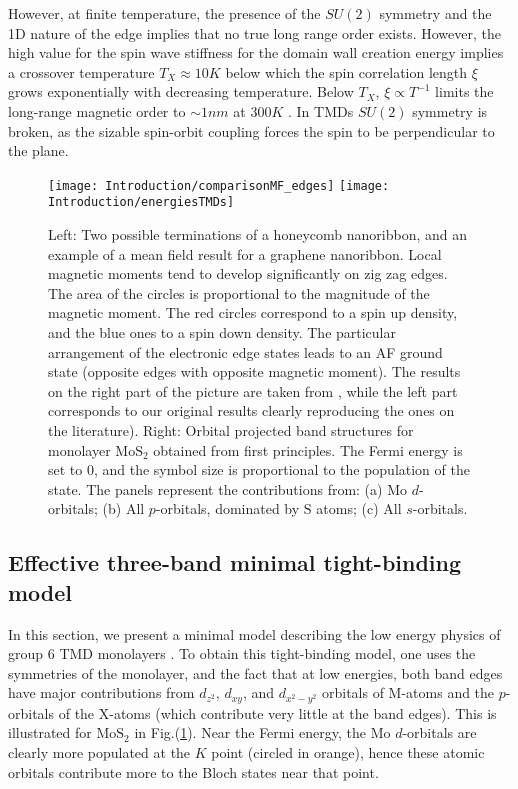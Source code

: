 However, at finite temperature, the presence of the $SU(2)$ symmetry and the \acs{1D} nature of the edge implies that no true long range order exists.
However, the high value for the spin wave stiffness for the domain wall creation energy implies a crossover temperature $T_X \approx 10 K$ below which the spin correlation length $\xi$ grows exponentially with decreasing temperature.
Below $T_X$, $\xi \propto T^{-1}$ limits the long-range magnetic order to $\sim 1 nm$ at $300 K$ \cite{yazyev_magnetic_2008}. 
In \acs{TMD}s $SU(2)$ symmetry is broken, as the sizable spin-orbit coupling forces the spin to be perpendicular to the plane.
\begin{figure}[H]
\texttt{[image: Introduction/comparisonMF\_edges]}
\hspace{5mm}
\texttt{[image: Introduction/energiesTMDs]}
 \caption[Zigzag edges of a nanoribbon and magnetism. Orbital projected band structures for monolayer $\text{Mo}\text{S}_2$ obtained from first principles.]{Left: Two possible terminations of a honeycomb nanoribbon, and an example of a mean field result for a  graphene nanoribbon.
Local magnetic moments tend to develop significantly on zig zag edges.
The area of the circles is proportional to the magnitude of the magnetic moment.
The red circles correspond to a spin up density, and the blue ones to a spin down density.
The particular arrangement of the electronic edge states leads to an \ac{AF} ground state (opposite edges with opposite magnetic moment). The results on the right part of the picture are taken from \cite{yazyev_emergence_2010}, while the left part corresponds to our original results clearly reproducing the ones on the literature). Right: Orbital projected band structures for monolayer $\text{Mo}\text{S}_2$ obtained from first principles.
The Fermi energy is set to 0, and the symbol size is proportional to the population of the state.
The panels represent the contributions from: (a) $\text{Mo}$ $d$-orbitals; (b) All $p$-orbitals, dominated by $\text{S}$ atoms; (c) All $s$-orbitals. \label{fig:nanoribbons_energiesTMDs}}
\end{figure}

\subsection{Effective three-band minimal tight-binding model}\label{subsec:threeband}

In this section, we present a minimal model describing the low energy physics of group 6 \acs{TMD} monolayers \cite{liu_three-band_2013}.
To obtain this tight-binding model, one uses the symmetries of the monolayer, and the fact that at low energies, both band edges have major contributions from $d_{z^2}$, $d_{xy}$, and $d_{x^2 - y^2}$ orbitals of M-atoms and the $p$-orbitals of the X-atoms (which contribute very little at the band edges).
This is illustrated for $\text{Mo}\text{S}_2$ in Fig.(\ref{fig:nanoribbons_energiesTMDs}).
Near the Fermi energy, the $\text{Mo}$ $d$-orbitals are clearly more populated at the $K$ point (circled in orange), hence these atomic orbitals contribute more to the Bloch states near that point.


